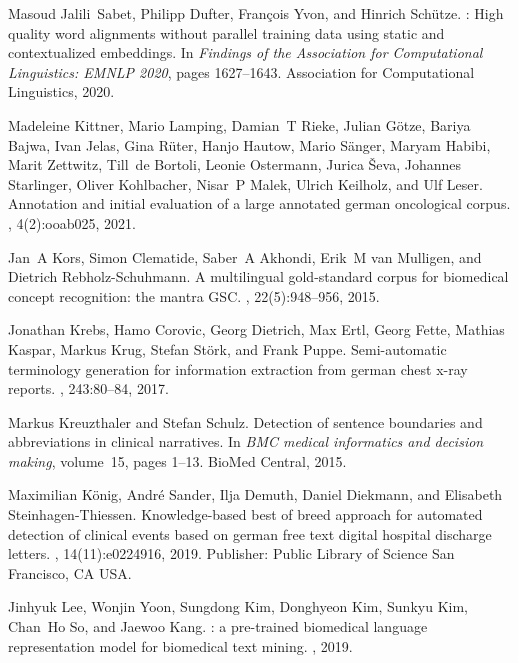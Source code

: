 \documentclass[runningheads]{llncs}
\begin{document}
\begin{thebibliography}{10}
Masoud Jalili~Sabet, Philipp Dufter, François Yvon, and Hinrich Schütze.
: High quality word alignments without parallel training
  data using static and contextualized embeddings.
\newblock In {\em Findings of the Association for Computational Linguistics:
  {EMNLP} 2020}, pages 1627--1643. Association for Computational Linguistics,
  2020.

Madeleine Kittner, Mario Lamping, Damian~T Rieke, Julian Götze, Bariya Bajwa,
  Ivan Jelas, Gina Rüter, Hanjo Hautow, Mario Sänger, Maryam Habibi, Marit
  Zettwitz, Till~de Bortoli, Leonie Ostermann, Jurica Ševa, Johannes
  Starlinger, Oliver Kohlbacher, Nisar~P Malek, Ulrich Keilholz, and Ulf Leser.
\newblock Annotation and initial evaluation of a large annotated german
  oncological corpus.
, 4(2):ooab025, 2021.

Jan~A Kors, Simon Clematide, Saber~A Akhondi, Erik~M van Mulligen, and Dietrich
  Rebholz-Schuhmann.
\newblock A multilingual gold-standard corpus for biomedical concept
  recognition: the mantra {GSC}.
,
  22(5):948--956, 2015.

Jonathan Krebs, Hamo Corovic, Georg Dietrich, Max Ertl, Georg Fette, Mathias
  Kaspar, Markus Krug, Stefan Störk, and Frank Puppe.
\newblock Semi-automatic terminology generation for information extraction from
  german chest x-ray reports.
, 243:80--84, 2017.

Markus Kreuzthaler and Stefan Schulz.
\newblock Detection of sentence boundaries and abbreviations in clinical
  narratives.
\newblock In {\em {BMC} medical informatics and decision making}, volume~15,
  pages 1--13. {BioMed} Central, 2015.

Maximilian König, André Sander, Ilja Demuth, Daniel Diekmann, and Elisabeth
  Steinhagen-Thiessen.
\newblock Knowledge-based best of breed approach for automated detection of
  clinical events based on german free text digital hospital discharge letters.
, 14(11):e0224916, 2019.
\newblock Publisher: Public Library of Science San Francisco, {CA} {USA}.

Jinhyuk Lee, Wonjin Yoon, Sungdong Kim, Donghyeon Kim, Sunkyu Kim, Chan~Ho So,
  and Jaewoo Kang.
: a pre-trained biomedical language representation model for
  biomedical text mining.
, 2019.


\end{thebibliography}
\end{document}
